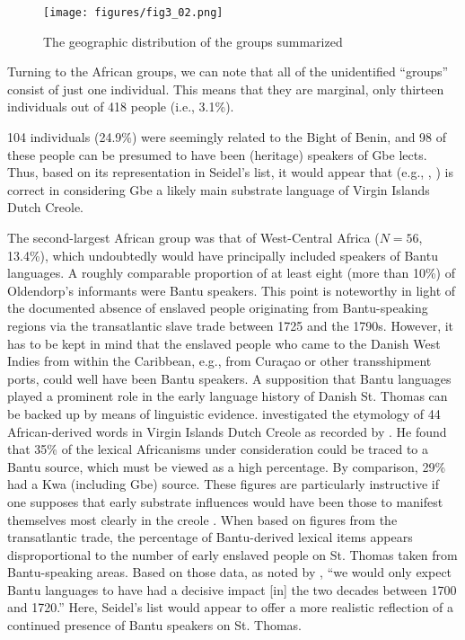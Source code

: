 \documentclass[output=paper,colorlinks,citecolor=brown]{langscibook}
\begin{document}
\begin{figure}[!ht]
    \centering
    \texttt{[image: figures/fig3\_02.png]}
    \caption{The geographic distribution of the groups summarized}
    \label{fig:fig3_02}
\end{figure}

Turning to the African groups, we can note that all of the unidentified ``groups'' consist of just one individual. This means that they are marginal, only thirteen individuals out of 418 people (i.e., 3.1\%).

104 individuals (24.9\%) were seemingly related to the Bight of Benin, and 98 of these people can be presumed to have been (heritage) speakers of Gbe lects. Thus, based on its representation in Seidel’s list, it would appear that \citeauthor{Sabino_1988} (e.g., \citeyear{Sabino_1988}, \citeyear{Sabino_2012}) is correct in considering Gbe a likely main substrate language of Virgin Islands Dutch Creole.

The second-largest African group was that of West-Central Africa ($N=56$, 13.4\%), which undoubtedly would have principally included speakers of Bantu languages. A roughly comparable proportion of at least eight (more than 10\%) of Oldendorp’s informants were Bantu speakers. This point is noteworthy in light of the documented absence of enslaved people originating from Bantu-speaking regions via the transatlantic slave trade between 1725 and the 1790s. However, it has to be kept in mind that the enslaved people who came to the Danish West Indies from within the Caribbean, e.g., from Cura\c{c}ao or other transshipment ports, could well have been Bantu speakers. A supposition that Bantu languages played a prominent role in the early language history of Danish St. Thomas can be backed up by means of linguistic evidence. \citet{Parkvall_2016} investigated the etymology of 44 African-derived words in Virgin Islands Dutch Creole as recorded by \citet{de_Josselin_de_Jong_1926}. He found that 35\% of the lexical Africanisms under consideration could be traced to a Bantu source, which must be viewed as a high percentage. By comparison, 29\% had a Kwa (including Gbe) source. These figures are particularly instructive if one supposes that early substrate influences would have been those to manifest themselves most clearly in the creole \citep[e.g.,][]{Mufwene_1996}. When based on figures from the transatlantic trade, the percentage of Bantu-derived lexical items appears disproportional to the number of early enslaved people on St. Thomas taken from Bantu-speaking areas. Based on those data, as noted by \citet[153]{Parkvall_2000}, “we would only expect Bantu languages to have had a decisive impact [in] the two decades between 1700 and 1720.” Here, Seidel's list would appear to offer a more realistic reflection of a continued presence of Bantu speakers on St. Thomas.
\end{document}
